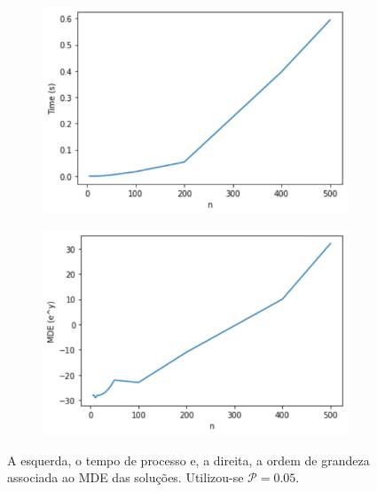 \documentclass[a4paper,12pt]{article}
\begin{document}
	\begin{figure}[H]
		\begin{center}
			\begin{minipage}{0.45 \linewidth}
				\begin{figure}[H]
					\begin{center}
						\includegraphics[width=1\linewidth]{figures/timePro2.png}
					\end{center}
				\end{figure}
			\end{minipage}
			\hspace{0.1cm}
			\begin{minipage}{0.45 \linewidth}
				
				\begin{figure}[H]
					\begin{center}
						\includegraphics[width=1\linewidth]{figures/mdeTriPro2.png}
					\end{center}
					\label{fig:mdeTri}
				\end{figure}
			\end{minipage}
		\end{center}
		\caption{A esquerda, o tempo de processo e, a direita, a ordem de grandeza associada ao MDE das soluções. Utilizou-se $\mathcal{P} = 0.05$.}
		\label{fig:triPri3}
	\end{figure}
	
\end{document}

